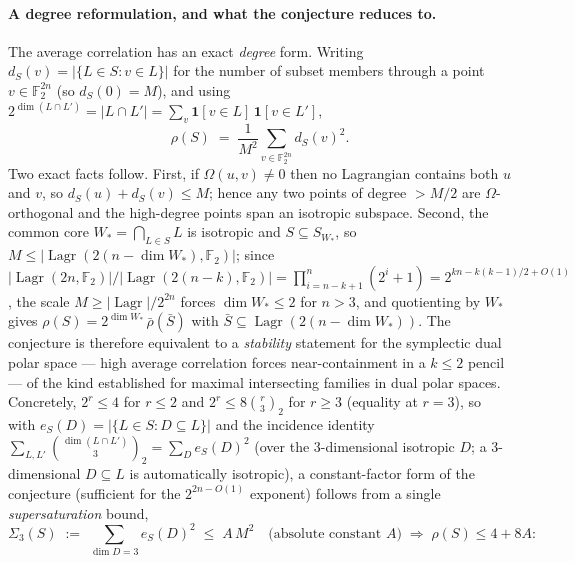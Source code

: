 \documentclass[11pt,a4paper]{article}
\theoremstyle{plain}
\theoremstyle{definition}
\newcommand{\F}{\mathbb{F}}
\DeclareMathOperator{\Lagr}{Lagr}
\begin{document}
\paragraph{A degree reformulation, and what the conjecture reduces to.} The average correlation has an exact \emph{degree} form. Writing $d_S(v) = |\{L \in S : v \in L\}|$ for the number of subset members through a point $v \in \F_2^{2n}$ (so $d_S(0) = M$), and using $2^{\dim(L \cap L')} = |L \cap L'| = \sum_v \mathbf 1[v \in L]\,\mathbf 1[v \in L']$,
\[
\rho(S) \;=\; \frac{1}{M^2}\sum_{v \in \F_2^{2n}} d_S(v)^2 .
\]
Two exact facts follow. First, if $\Omega(u,v) \neq 0$ then no Lagrangian contains both $u$ and $v$, so $d_S(u) + d_S(v) \le M$; hence any two points of degree $> M/2$ are $\Omega$-orthogonal and the high-degree points span an isotropic subspace. Second, the common core $W_* = \bigcap_{L \in S} L$ is isotropic and $S \subseteq S_{W_*}$, so $M \le |\Lagr(2(n-\dim W_*),\F_2)|$; since $|\Lagr(2n,\F_2)|/|\Lagr(2(n-k),\F_2)| = \prod_{i=n-k+1}^{n}(2^i+1) = 2^{kn - k(k-1)/2 + O(1)}$, the scale $M \ge |\Lagr|/2^{2n}$ forces $\dim W_* \le 2$ for $n > 3$, and quotienting by $W_*$ gives $\rho(S) = 2^{\dim W_*}\,\bar\rho(\bar S)$ with $\bar S \subseteq \Lagr(2(n-\dim W_*))$. The conjecture is therefore equivalent to a \emph{stability} statement for the symplectic dual polar space --- high average correlation forces near-containment in a $k \le 2$ pencil --- of the kind established for maximal intersecting families in dual polar spaces. Concretely, $2^r \le 4$ for $r \le 2$ and $2^r \le 8\binom{r}{3}_2$ for $r \ge 3$ (equality at $r = 3$), so with $e_S(D) = |\{L \in S : D \subseteq L\}|$ and the incidence identity $\sum_{L,L'}\binom{\dim(L \cap L')}{3}_2 = \sum_{D}e_S(D)^2$ (over the $3$-dimensional isotropic $D$; a $3$-dimensional $D \subseteq L$ is automatically isotropic), a constant-factor form of the conjecture (sufficient for the $2^{2n-O(1)}$ exponent) follows from a single \emph{supersaturation} bound,
\[
\Sigma_3(S) \;:=\; \sum_{\dim D = 3} e_S(D)^2 \;\le\; A\,M^2 \quad\text{(absolute constant $A$)} \;\Longrightarrow\; \rho(S) \le 4 + 8A :
\]
\end{document}

